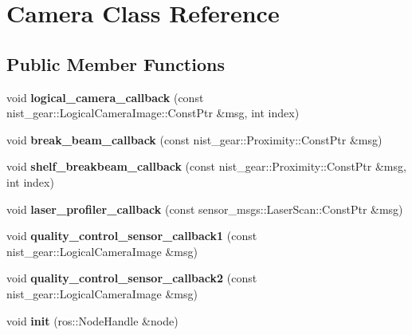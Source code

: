 \hypertarget{classCamera}{}\section{Camera Class Reference}
\label{classCamera}
\subsection*{Public Member Functions}
\begin{DoxyCompactItemize}
\item 
\mbox{\label{classCamera_ac714ccfafadeb2bbcb8a86ceecff3573}} 
void {\bfseries logical\+\_\+camera\+\_\+callback} (const nist\+\_\+gear\+::\+Logical\+Camera\+Image\+::\+Const\+Ptr \&msg, int index)
\item 
\mbox{\label{classCamera_aa9c6662f99ec13ccacbf6befca8aa146}} 
void {\bfseries break\+\_\+beam\+\_\+callback} (const nist\+\_\+gear\+::\+Proximity\+::\+Const\+Ptr \&msg)
\item 
\mbox{\label{classCamera_a5cef87568b34aa96361b4d8dfd36302d}} 
void {\bfseries shelf\+\_\+breakbeam\+\_\+callback} (const nist\+\_\+gear\+::\+Proximity\+::\+Const\+Ptr \&msg, int index)
\item 
\mbox{\label{classCamera_ae71b89ea4a52b51d87291aaca679eae4}} 
void {\bfseries laser\+\_\+profiler\+\_\+callback} (const sensor\+\_\+msgs\+::\+Laser\+Scan\+::\+Const\+Ptr \&msg)
\item 
\mbox{\label{classCamera_a04a22f0a171e041842e7b3c0f9a1c0f9}} 
void {\bfseries quality\+\_\+control\+\_\+sensor\+\_\+callback1} (const nist\+\_\+gear\+::\+Logical\+Camera\+Image \&msg)
\item 
\mbox{\label{classCamera_a5397f225efceb4afeb6a70824979ef7d}} 
void {\bfseries quality\+\_\+control\+\_\+sensor\+\_\+callback2} (const nist\+\_\+gear\+::\+Logical\+Camera\+Image \&msg)
\item 
\mbox{\label{classCamera_aec0b4b2d6164992283767db0ee8344fc}} 
void {\bfseries init} (ros\+::\+Node\+Handle \&node)
\item 
\mbox{\label{classCamera_a1cca80a0e5c9f044e2d524f72ddb724c}} 

\end{DoxyCompactItemize}

